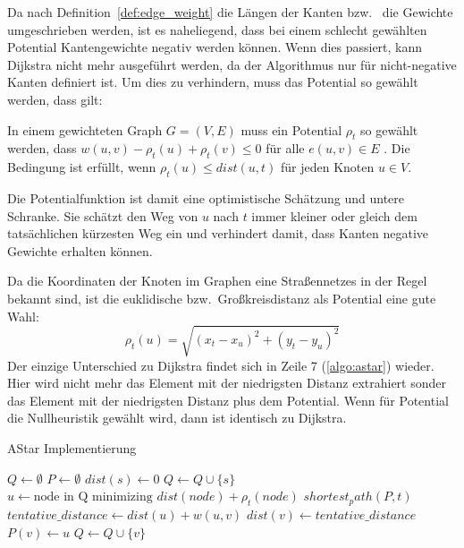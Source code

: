 Da nach Definition~\ref{def:edge_weight} die Längen der Kanten bzw.~ die Gewichte umgeschrieben
werden, ist es naheliegend, dass bei einem schlecht gewählten Potential Kantengewichte negativ
werden können. Wenn dies passiert, kann Dijkstra nicht mehr ausgeführt werden, da der Algorithmus
nur für nicht-negative Kanten definiert ist. Um dies zu verhindern, muss das Potential so gewählt
werden, dass gilt:
\begin{definition}
    In einem gewichteten Graph $G=(V,E)$ muss ein Potential $\rho_t$ so gewählt werden, dass
    $w(u,v) - \rho_t(u) + \rho_t (v) \le 0$ für alle $e(u,v) \in E$ . Die Bedingung ist erfüllt, wenn
    ${\rho_t (u) \le dist(u,t)}$ für jeden Knoten $u \in V$.
\end{definition}
Die Potentialfunktion ist damit eine optimistische Schätzung und untere Schranke. Sie schätzt den
Weg von $u$ nach $t$ immer kleiner oder gleich dem tatsächlichen kürzesten Weg ein und verhindert
damit, dass Kanten negative Gewichte erhalten können.

Da die Koordinaten der Knoten im Graphen eine Straßennetzes in der Regel bekannt sind, ist die
euklidische bzw.~Großkreisdistanz als Potential eine gute Wahl:
\begin{equation}
    \rho_t(u) = \sqrt{(x_t - x_u)^2 + (y_t - y_u)^2}
\end{equation}
Der einzige Unterschied zu Dijkstra findet sich in Zeile 7 (\ref{algo:astar}) wieder. Hier wird
nicht mehr das Element mit der niedrigsten Distanz extrahiert sonder das Element mit der niedrigsten
Distanz plus dem Potential. Wenn für Potential die Nullheuristik gewählt wird, dann ist \astar
identisch zu Dijkstra.\\
\begin{algorithm}[H]
    \caption{AStar Implementierung}
    \label{algo:astar}
    \begin{algorithmic}[1]
        \State $Q \gets \emptyset$
        \State $P \gets \emptyset$ 
        \State $dist(s) \gets 0$
        \State $Q \gets Q \cup \{s\}$
        \State $u \gets \text{node in Q minimizing } dist(node) + \rho_t(node)$ 
        \State \Return $shortest_path(P,t)$
        \EndIf
        \State $tentative\_distance \gets dist(u) + w(u,v)$
        \State $dist(v) \gets tentative\_distance$
        \State $P(v) \gets u$
        \State $Q \gets Q \cup \{v\}$
        \EndIf
        \EndFor
        \EndWhile
        \EndFunction
    \end{algorithmic}
\end{algorithm}

